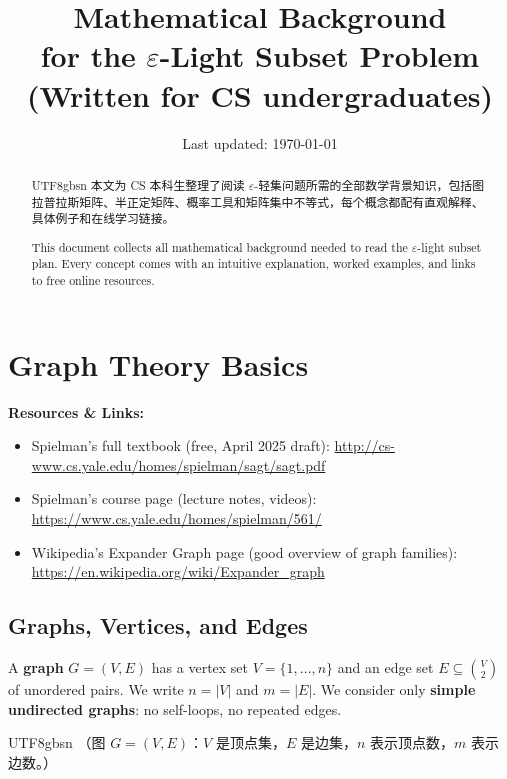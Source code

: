 \documentclass[12pt]{article}
\title{\textbf{Mathematical Background}\\
\large for the $\varepsilon$-Light Subset Problem\\[4pt]
\normalsize (Written for CS undergraduates)}
\author{}
\date{Last updated: \today}
\theoremstyle{definition}
\theoremstyle{remark}
\newcommand{\resources}[1]{%
  \vspace{4pt}
  \noindent\colorbox{blue!8}{\parbox{\dimexpr\linewidth-2\fboxsep}{%
    \small\textbf{Resources \& Links:} #1}}
  \vspace{4pt}
}
\begin{document}
\maketitle

\begin{abstract}
\begin{CJK}{UTF8}{gbsn}
本文为 CS 本科生整理了阅读 $\varepsilon$-轻集问题所需的全部数学背景知识，包括图拉普拉斯矩阵、半正定矩阵、概率工具和矩阵集中不等式，每个概念都配有直观解释、具体例子和在线学习链接。
\end{CJK}

\medskip
This document collects all mathematical background needed to read the $\varepsilon$-light subset plan.
Every concept comes with an intuitive explanation, worked examples, and links to free online resources.
\end{abstract}

\tableofcontents
\newpage

\section{Graph Theory Basics}

\resources{
\begin{itemize}\setlength\itemsep{0pt}
  \item Spielman's full textbook (free, April 2025 draft):
        \url{http://cs-www.cs.yale.edu/homes/spielman/sagt/sagt.pdf}
  \item Spielman's course page (lecture notes, videos):
        \url{https://www.cs.yale.edu/homes/spielman/561/}
  \item Wikipedia's Expander Graph page (good overview of graph families):
        \url{https://en.wikipedia.org/wiki/Expander_graph}
\end{itemize}
}

\subsection{Graphs, Vertices, and Edges}

A \textbf{graph} $G = (V, E)$ has a vertex set $V = \{1,\ldots,n\}$ and an edge set
$E \subseteq \binom{V}{2}$ of unordered pairs.  We write $n = |V|$ and $m = |E|$.
We consider only \textbf{simple undirected graphs}: no self-loops, no repeated edges.

\begin{CJK}{UTF8}{gbsn}
（图 $G=(V,E)$：$V$ 是顶点集，$E$ 是边集，$n$ 表示顶点数，$m$ 表示边数。）
\end{CJK}
\end{document}
